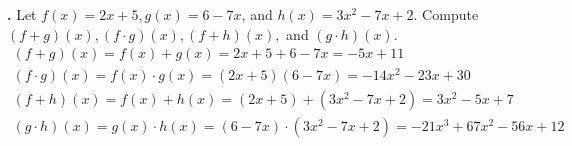 \documentclass[a4paper,11pt]{article}
\begin{document}
\newpage
\setcounter{SubsectionCounter}{2}
\textbf{.} Let \(f{(x)} = 2x+5, g{(x)} = 6 - 7x\), and \(h{(x)} = 3x^2 - 7x + 2\). 
Compute \({(f+g)}{(x)}, {(f \cdot g)}{(x)}, {(f + h)}{(x)},\) and \({(g \cdot 
h)}{(x)}\).
\begin{align}
  {(f+g)}{(x)} = f{(x)} + g{(x)} = 2x+5 + 6 - 7x = -5x + 11\\
  {(f \cdot g)}{(x)} = f{(x)} \cdot g{(x)} = {(2x+5)}{(6 - 7x)} = -14 x^2-23 
  x+30\\
  {(f+h)}{(x)} = f{(x)} + h{(x)} = {(2x+5)} + {(3x^2 - 7x + 2)} = 3 x^2 -5x+7\\
  {(g \cdot h)}{(x)} = g{(x)} \cdot h{(x)} = {(6 - 7x)} \cdot {(3x^2 - 7x + 2)} = -21x^3 + 67x^2 -56x + 12
\end{align}
\end{document}

